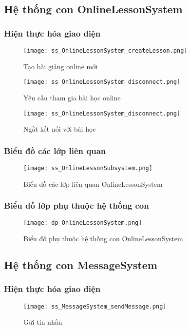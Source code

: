 \documentclass[./../main.tex]{subfiles}
\begin{document}
\subsection{Hệ thống con OnlineLessonSystem}
\subsubsection{Hiện thực hóa giao diện}
\begin{figure}[H]
    \centering
    \texttt{[image: ss\_OnlineLessonSystem\_createLesson.png]}
    \caption{Tạo bài giảng online mới}
    \label{ss_ols_cl}
\end{figure}

\begin{figure}[H]
    \centering
    \texttt{[image: ss\_OnlineLessonSystem\_disconnect.png]}
    \caption{Yêu cầu tham gia bài học online}
    \label{ss_ols_rjl}
\end{figure}

\begin{figure}[H]
    \centering
    \texttt{[image: ss\_OnlineLessonSystem\_disconnect.png]}
    \caption{Ngắt kết nối với bài học}
    \label{ss_ols_d}
\end{figure}
\subsubsection{Biểu đồ các lớp liên quan}
\begin{figure}[H]
    \centering
    \texttt{[image: ss\_OnlineLessonSubsystem.png]}
    \caption{Biểu đồ các lớp liên quan OnlineLessonSystem}
\label{ss_ols}
\end{figure}
\subsubsection{Biểu đồ lớp phụ thuộc hệ thống con}
\begin{figure}[H]
    \centering
    \texttt{[image: dp\_OnlineLessonSystem.png]}
    \caption{Biểu đồ phụ thuộc hệ thống con OnlineLessonSystem}
    \label{dp_ols}
\end{figure}

\subsection{Hệ thống con MessageSystem}
\subsubsection{Hiện thực hóa giao diện}
\begin{figure}[H]
    \centering
    \texttt{[image: ss\_MessageSystem\_sendMessage.png]}
    \caption{Gửi tin nhắn}
    \label{ss_ms_sm}
\end{figure}
\end{document}
